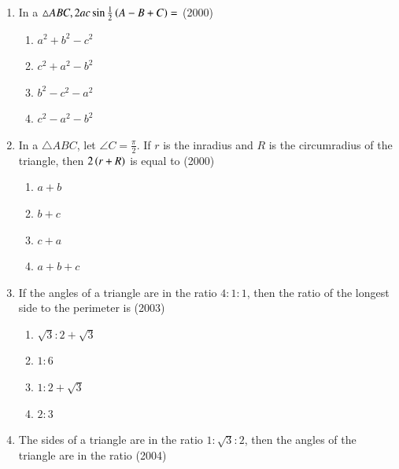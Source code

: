 \begin{enumerate}[label=\thesubsection.\arabic*,ref=\thesubsection.\theenumi]
\begin{multicols}{4}
\begin{enumerate}
\item $\frac{1}{\sqrt6}$
\item $\frac{1}{3}$
\item $\frac{1}{\sqrt3}$
\item $\sqrt{\frac{2}{3}}$
\end{enumerate}
	    \end{multicols}
%
\item In a $\triangle ABC, 2ac\sin\frac{1}{2}\left(A-B+C\right) = $
\hfill (2000)
	    \begin{multicols}{2}
\begin{enumerate}
\item $a^2 + b^2 - c^2$
\item $c^2 + a^2 - b^2$
\item $b^2 - c^2 - a^2$
\item $c^2 - a^2 - b^2$
\end{enumerate}
	    \end{multicols}
%
\item In a $\triangle ABC$, let $\angle C = \frac{\pi}{2}$. If ${r}$ is the inradius and ${R}$ is the circumradius of the triangle, then $2\left(r+R\right)$ is equal to
\hfill (2000)
\begin{multicols}{4}
\begin{enumerate}
\item $a+b$
\item $b+c$
\item $c+a$
\item $a+b+c$
\end{enumerate}
\end{multicols}
\item If the angles of a triangle are in the ratio $4\colon1\colon1$, then the ratio of the longest side to the perimeter is
\hfill (2003)
\begin{multicols}{4}
\begin{enumerate}
\item $\sqrt{3}\colon2+\sqrt{3}$
\item $1\colon6$
\item $1\colon2+\sqrt{3}$
\item $2\colon3$
\end{enumerate}
\end{multicols}
%
\item The sides of a triangle are in the ratio $1\colon\sqrt{3}\colon2$, then the angles of the triangle are in the ratio
\hfill (2004)
\begin{multicols}{2}
\begin{enumerate}

\end{enumerate}
\end{multicols}
\end{enumerate}
